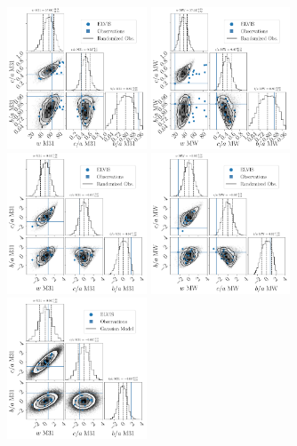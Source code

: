\documentclass[a4paper,fleqn,usenatbib]{mnras}
\begin{document}
\begin{figure}
\centering
\includegraphics[width=0.37\textwidth]{input_elvis_obs_M31_n_11.pdf}
\includegraphics[width=0.37\textwidth]{input_elvis_obs_MW_n_11.pdf}
\includegraphics[width=0.37\textwidth]{input_elvis_obs_M31_n_11_normed.pdf}
\includegraphics[width=0.37\textwidth]{input_elvis_obs_MW_n_11_normed.pdf}
\includegraphics[width=0.37\textwidth]{gaussian_model_elvis_M31_n_11.pdf}

\end{figure}
\end{document}
